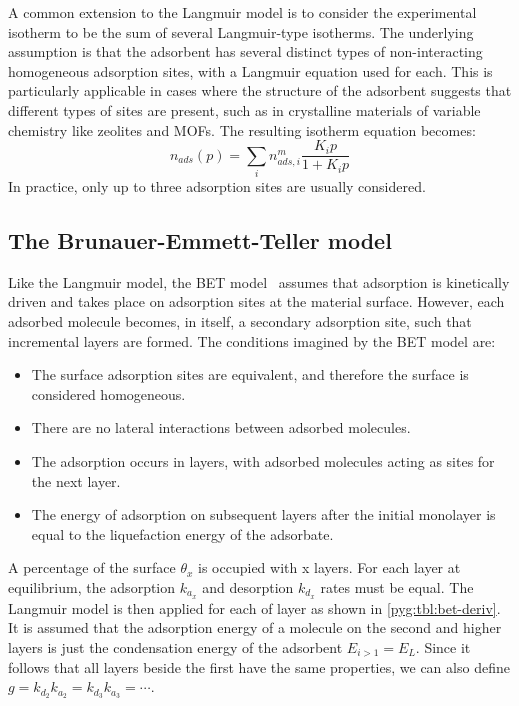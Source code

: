 A common extension to the Langmuir model is to consider
the experimental isotherm to be the sum of several Langmuir-type
isotherms. The underlying assumption is that the adsorbent has 
several distinct types of non-interacting homogeneous adsorption 
sites, with a Langmuir equation used for each. This is particularly
applicable in cases where the structure of the adsorbent
suggests that different types of sites are present,
such as in crystalline materials of variable chemistry like
zeolites and \glspl{MOF}. The resulting isotherm equation becomes:
%
\begin{equation}\label{pyg:eqn:langmulti}
	n_{ads}(p) = \sum_i n_{ads,i}^m\frac{K_i p}{1+K_i p}
\end{equation}
%
In practice, only up to three adsorption sites are usually
considered.

\subsection{The Brunauer-Emmett-Teller model}\label{pyg:models:bet}

Like the Langmuir model, the \gls{BET} model~\cite{brunauerAdsorptionGasesMultimolecular1938}
assumes that adsorption is kinetically driven and takes place on adsorption
sites at the material surface. However, each adsorbed molecule becomes,
in itself, a secondary adsorption site, such that incremental layers
are formed. The conditions imagined by the \gls{BET} model are:

\begin{itemize}
	\item The surface adsorption sites are equivalent, and therefore the
	      surface is considered homogeneous.
	\item There are no lateral interactions between adsorbed
	      molecules.
	\item The adsorption occurs in layers, with adsorbed
	      molecules acting as sites for the next layer.
	\item The energy of adsorption on subsequent layers after 
		  the initial monolayer is equal to the liquefaction energy
		  of the adsorbate.
\end{itemize}

A percentage of the surface \(\theta_x\) is occupied with
x layers. For each layer at equilibrium, the adsorption 
\(k_{a_x}\) and desorption \(k_{d_x}\) rates must be equal.
The Langmuir model is then applied for each of layer
as shown in \autoref{pyg:tbl:bet-deriv}. It is assumed
that the adsorption energy of a molecule on the second
and higher layers is just the condensation energy of the
adsorbent \(E_{i>1} = E_L\). Since it follows that
all layers beside the first have the same properties,
we can also define \(g= {k_{d_2}}{k_{a_2}} = {k_{d_3}}{k_{a_3}} =
\cdots \).


